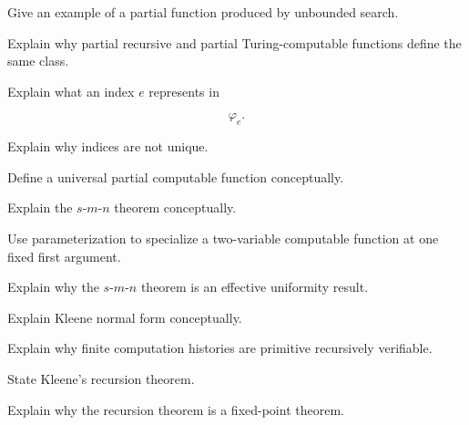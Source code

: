 \begin{exercise}[3]
Give an example of a partial function produced by unbounded search.
\end{exercise}

\begin{exercise}[3]
Explain why partial recursive and partial Turing-computable functions define
the same class.
\end{exercise}

\begin{exercise}[2]
Explain what an index \(e\) represents in

\[
\varphi_e.
\]
\end{exercise}

\begin{exercise}[2]
Explain why indices are not unique.
\end{exercise}

\begin{exercise}[3]
Define a universal partial computable function conceptually.
\end{exercise}

\begin{exercise}[3]
Explain the \(s\)-\(m\)-\(n\) theorem conceptually.
\end{exercise}

\begin{exercise}[3]
Use parameterization to specialize a two-variable computable function at one
fixed first argument.
\end{exercise}

\begin{exercise}[3]
Explain why the \(s\)-\(m\)-\(n\) theorem is an effective uniformity result.
\end{exercise}

\begin{exercise}[3]
Explain Kleene normal form conceptually.
\end{exercise}

\begin{exercise}[3]
Explain why finite computation histories are primitive recursively
verifiable.
\end{exercise}

\begin{exercise}[3]
State Kleene's recursion theorem.
\end{exercise}

\begin{exercise}[3]
Explain why the recursion theorem is a fixed-point theorem.
\end{exercise}

